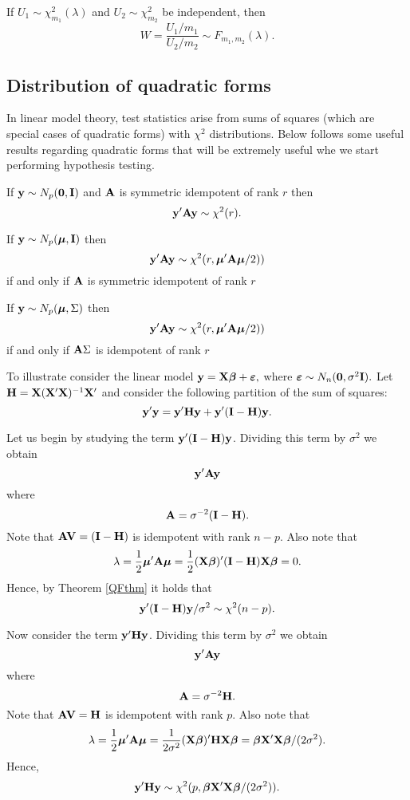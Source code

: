 If $U_1 \sim \chi^2_{m_1}(\lambda)$ and $U_2\sim \chi^2_{m_2}$ be independent, then
$$
W = \frac{U_1/m_1}{U_2/m_2} \sim F_{m_1,m_2} (\lambda).
$$



\subsection{Distribution of quadratic forms}
\label{sec:qf}

In linear model theory, test statistics arise from sums of squares
(which are special cases of quadratic forms) with $\chi^2$ distributions.
Below follows some useful results regarding quadratic forms that will be extremely useful whe we start performing hypothesis testing.

\bstheo
If $\mathbf{y} \sim N_p(\mathbf{0}, \mathbf{I})$ and $\mathbf{A}$ is symmetric idempotent of rank $r$ then $$\mathbf{y}' \mathbf{A} \mathbf{y} \sim \chi^2(r).$$
\estheo


\bstheo
If $\mathbf{y} \sim N_p(\mbox{\boldmath $\mu$}, \mathbf{I})$ then $$\mathbf{y}' \mathbf{A} \mathbf{y} \sim \chi^2(r,\mbox{\boldmath $\mu$}'\mathbf{A} \mbox{\boldmath $\mu$}/{2}))$$ if and only if $\mathbf{A}$ is symmetric idempotent of rank $r$ 
\estheo


\bstheo
\label{QFthm}
If $\mathbf{y} \sim N_p(\mbox{\boldmath $\mu$}, \Sigma)$ then $$\mathbf{y}' \mathbf{A} \mathbf{y} \sim \chi^2(r,\mbox{\boldmath $\mu$}'\mathbf{A} \mbox{\boldmath $\mu$}/{2}))$$ if and only if $\mathbf{A} \Sigma$ is idempotent of rank $r$ 
\estheo



\vb
\bexa
To illustrate consider the linear model $\mathbf{y=X\mbox{\boldmath $\beta$} + \mbox{\boldmath $\varepsilon$}},$ where $\mbox{\boldmath $\varepsilon$} \sim N_n(\mathbf{0}, \sigma^2 \mathbf{I}).$
Let $\mathbf{H} = \mathbf{X} (\mathbf{X}' \mathbf{X})^{-1} \mathbf{X}'$ and consider the following  partition of the sum of squares:
$$
\mathbf{y}'\mathbf{y} = \mathbf{y}'\mathbf{H}\mathbf{y} + \mathbf{y}'(\mathbf{I} - \mathbf{H})\mathbf{y}.
$$

Let us begin by studying the term $\mathbf{y}'(\mathbf{I} - \mathbf{H})\mathbf{y}$. 
Dividing this term by $\sigma^2$ we obtain $$\mathbf{y}' \mathbf{A} \mathbf{y}$$ where $$\mathbf{A} = \sigma^{-2}(\mathbf{I} - \mathbf{H}).$$
Note that  $\mathbf{A} \mathbf{V} = (\mathbf{I} - \mathbf{H})$ is idempotent with rank $n-p$. 
Also note that
$$
\lambda = \frac{1}{2} \mbox{\boldmath $\mu$}' \mathbf{A} \mbox{\boldmath $\mu$} = \frac{1}{2} (\mathbf{X} \mbox{\boldmath $\beta$})' (\mathbf{I} - \mathbf{H}) \mathbf{X} \mbox{\boldmath $\beta$} =0.
$$
Hence, by Theorem \ref{QFthm} it holds that
$$
\mathbf{y}' (\mathbf{I} - \mathbf{H}) \mathbf{y}/\sigma^2 \sim \chi^2(n-p).
$$

Now consider the term $\mathbf{y}' \mathbf{H} \mathbf{y}$.
Dividing this term by $\sigma^2$ we obtain $$\mathbf{y}' \mathbf{A} \mathbf{y}$$ where $$\mathbf{A} = \sigma^{-2}\mathbf{H}.$$
Note that  $\mathbf{A} \mathbf{V} = \mathbf{H}$ is idempotent with rank $p$. 
Also note that 
$$
\lambda = \frac{1}{2} \mbox{\boldmath $\mu$}' \mathbf{A} \mbox{\boldmath $\mu$} = \frac{1}{2 \sigma^2} (\mathbf{X} \mbox{\boldmath $\beta$})' \mathbf{H} \mathbf{X} \mbox{\boldmath $\beta$} = \mbox{\boldmath $\beta$} \mathbf{X}' \mathbf{X} \mbox{\boldmath $\beta$}/ (2 \sigma^2).
$$
Hence, 
$$
\mathbf{y}' \mathbf{H} \mathbf{y} \sim \chi^2(p,  \mbox{\boldmath $\beta$} \mathbf{X}' \mathbf{X} \mbox{\boldmath $\beta$}/ (2 \sigma^2)).
$$
\eexa


